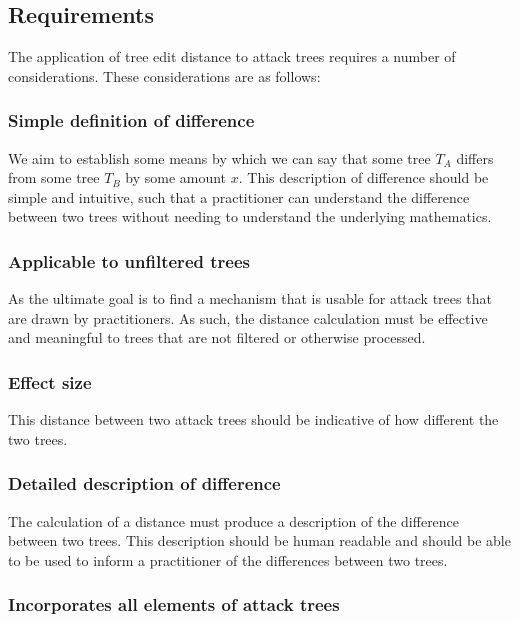 \subsection{Requirements}
\label{ssec:requirements}

The application of tree edit distance to attack trees requires a number of considerations. These considerations are as follows:

\subsubsection{Simple definition of difference}

We aim to establish some means by which we can say that some tree $T_A$ differs from some tree $T_B$ by some amount $x$. This description of difference should be simple and intuitive, such that a practitioner can understand the difference between two trees without needing to understand the underlying mathematics.

\subsubsection{Applicable to unfiltered trees}

As the ultimate goal is to find a mechanism that is usable for attack trees that are drawn by practitioners. As such, the distance calculation must be effective and meaningful to trees that are not filtered or otherwise processed. 

\subsubsection{Effect size}

This distance between two attack trees should be indicative of how different the two trees. 


\subsubsection{Detailed description of difference}

The calculation of a distance must produce a description of the difference between two trees. This description should be human readable and should be able to be used to inform a practitioner of the differences between two trees.

\subsubsection{Incorporates all elements of attack trees}

